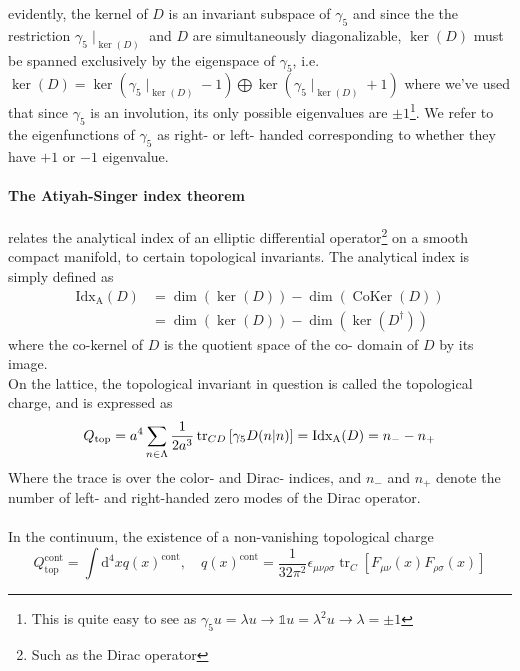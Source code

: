 \documentclass[a4paper,10pt]{article}
\begin{document}
evidently, the kernel of $D$ is an invariant subspace of $\gamma_5$ and since the the restriction $\gamma_5\mid_{\operatorname{ker}(D)}$ and $D$ are simultaneously diagonalizable, $\operatorname{ker}(D)$ must be spanned exclusively by the eigenspace of $\gamma_5$, i.e. $\operatorname{ker}(D) = \operatorname{ker}\left( \gamma_5\mid_{\operatorname{ker}(D)} -1 \right) \bigoplus\operatorname{ker}\left( \gamma_5\mid_{\operatorname{ker}(D)} +1 \right)$ where we've used that since $\gamma_5$ is an involution, its only possible eigenvalues are $\pm1$\footnote{This is quite easy to see as $\gamma_5 u = \lambda u\rightarrow \mathbb{1} u = \lambda^2 u\rightarrow \lambda=\pm1$}. We refer to the eigenfunctions of $\gamma_5$ as right- or left- handed corresponding to whether they have $+1$ or $-1$ eigenvalue.\paragraph{The Atiyah-Singer index theorem} relates the analytical index of an elliptic differential operator\footnote{Such as the Dirac operator} on a smooth compact manifold, to certain topological invariants. The analytical index is simply defined as
\begin{equation}
\begin{aligned} 
\operatorname{Idx_A}(D) &= \operatorname{dim}(\operatorname{ker}(D))-\operatorname{dim}(\operatorname{CoKer}(D))\\&= \operatorname{dim}(\operatorname{ker}(D))-\operatorname{dim}(\operatorname{ker}(D^\dagger))
\end{aligned} 
\end{equation}
where the co-kernel of $D$ is the quotient space of the co- domain of $D$ by its image.\\On the lattice, the topological invariant in question is called the topological charge, and is expressed as 
\begin{equation}
Q_{\mathrm{top}}=a^{4} \sum_{n \in \Lambda} \frac{1}{2 a^{3}} \operatorname{tr}_{C D}\left[\gamma_{5} D(n\mkern-5mu\mid\mkern-5mu n)\right]=\operatorname{Idx_A}(D)=n_{-}-n_{+}
\end{equation}
Where the trace is over the color- and Dirac- indices, and $n_-$ and $n_+$ denote the number of left- and right-handed zero modes of the Dirac operator.\\\\In the continuum, the existence of a non-vanishing topological charge
\begin{equation}\label{eq:topological_charge}
Q_{\mathrm{top}}^{\mathrm{cont}}=\int \mathrm{d}^{4} x q(x)^{\mathrm{cont}}, \quad q(x)^{\mathrm{cont}}=\frac{1}{32 \pi^{2}} \epsilon_{\mu \nu \rho \sigma} \operatorname{tr}_{C}\left[F_{\mu \nu}(x) F_{\rho \sigma}(x)\right]
\end{equation}
\end{document}
